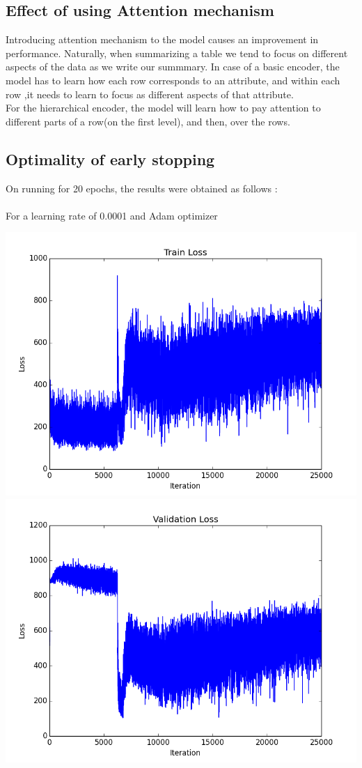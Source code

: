 \documentclass[12pt]{report}
\begin{document}
\subsection{Effect of using Attention mechanism}
Introducing attention mechanism to the model causes an improvement in performance. Naturally, when summarizing a table we tend to focus on different aspects of the data as we write our summmary. 
In case of a basic encoder, the model has to learn how each row corresponds to an attribute, and within each row ,it needs to learn to focus as different aspects of that attribute.\\
For the hierarchical encoder, the model will learn how to pay attention to different parts of a row(on the first level), and then, over the rows. 

\subsection{Optimality of early stopping}
On running for 20 epochs, the results were obtained as follows :\\\\
For a learning rate of 0.0001 and Adam optimizer
\begin{center}
\includegraphics[scale=0.5]{train_loss1.png} \\
\vspace{3mm}
\includegraphics[scale=0.5]{val_loss1.png} 
\end{center}
\end{document}
